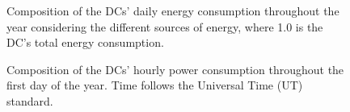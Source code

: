 

\begin{figure}[t]
  \centering
   {}
  \caption{Composition of the DCs' daily energy consumption throughout the year considering the different sources of energy, where 1.0 is the DC's total energy consumption.}
  \label{fig:energy_ratio_daily}
\end{figure}





 \begin{figure}[t]
  \centering
   {}
  \caption{Composition of the DCs' hourly power consumption throughout the first day of the year. Time follows the Universal Time (UT) standard.}
  \label{fig:power_ratio_hourly}
\end{figure}


